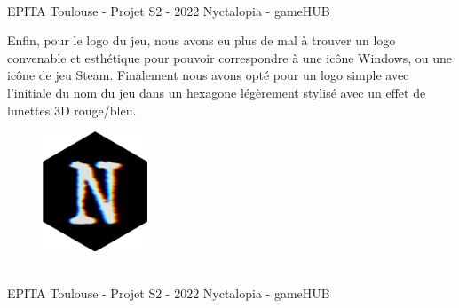 \vfill
\noindent\makebox[\linewidth]{\rule{.8\paperwidth}{.6pt}}\\[0.2cm]
EPITA Toulouse - Projet S2 - 2022 \hfill Nyctalopia - gameHUB
\noindent\makebox[\linewidth]{\rule{.8\paperwidth}{.6pt}}
\newpage


Enfin, pour le logo du jeu, nous avons eu plus de mal à trouver un logo convenable et esthétique pour pouvoir correspondre à une icône Windows, ou une icône de jeu Steam. Finalement nous avons opté pour un logo simple avec l'initiale du nom du jeu dans un hexagone légèrement stylisé avec un effet de lunettes 3D rouge/bleu.

\vspace*{7mm}
\begin{figure}[H]
\centering
\begin{minipage}{.5\textwidth}
  \centering
  \centerline{\includegraphics[width=1\linewidth]{img/logos/logojeu.png}}
  \label{fig:octobercrowfont}
\end{minipage}%
\end{figure}


\vfill
\noindent\makebox[\linewidth]{\rule{.8\paperwidth}{.6pt}}\\[0.2cm]
EPITA Toulouse - Projet S2 - 2022 \hfill Nyctalopia - gameHUB
\noindent\makebox[\linewidth]{\rule{.8\paperwidth}{.6pt}}
\newpage


